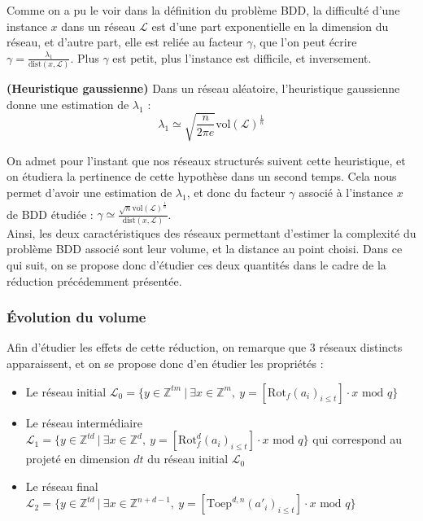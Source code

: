 \documentclass[11pt,a4paper]{article}
\begin{document}
Comme on a pu le voir dans la définition du problème BDD, la difficulté d'une instance $x$ dans un réseau $\mathcal{L}$ est d'une part exponentielle en la dimension du réseau, et d'autre part, elle est reliée au facteur $\gamma$, que l'on peut écrire $\gamma = \frac{\lambda_1}{\text{dist}(x,\mathcal{L})}$. Plus $\gamma$ est petit, plus l'instance est difficile, et inversement. \\


\begin{rem}\textbf{(Heuristique gaussienne)}
Dans un réseau aléatoire, l'heuristique gaussienne donne une estimation de $\lambda_1$ :  \[\lambda_1 \simeq \sqrt{\frac{n}{2\pi e}}\text{vol}(\mathcal{L})^\frac{1}{n} \]
\end{rem}

On admet pour l'instant que nos réseaux structurés suivent cette heuristique, et on étudiera la pertinence de cette hypothèse dans un second temps. Cela nous permet d'avoir une estimation de $\lambda_1$, et donc du facteur $\gamma$ associé à l'instance $x$ de BDD étudiée : $\gamma \simeq \frac{\sqrt{n}\text{vol}(\mathcal{L})^\frac{1}{n}}{\text{dist}(x,\mathcal{L})}$. \\

Ainsi, les deux caractéristiques des réseaux permettant d'estimer la complexité du problème BDD associé sont leur volume, et la distance au point choisi.  Dans ce qui suit, on se propose donc d'étudier ces deux quantités dans le cadre de la réduction précédemment présentée.

\subsubsection{Évolution du volume}

Afin d'étudier les effets de cette réduction, on remarque que $3$ réseaux distincts apparaissent, et on se propose donc d'en étudier les propriétés : 
\begin{itemize}
\item Le réseau initial $\mathcal{L}_0 = \{ y \in \mathbb{Z}^{tm} \ | \ \exists x\in \mathbb{Z}^m,\ y=[\text{Rot}_f(a_i)_{i\leq t}]\cdot x \text{ mod }q \}$
\item Le réseau intermédiaire $\mathcal{L}_1 =\{ y \in \mathbb{Z}^{td} \ | \ \exists x\in \mathbb{Z}^d,\ y=[\text{Rot}_f^d(a_i)_{i\leq t}]\cdot x \text{ mod }q \}$  qui correspond au projeté en dimension $dt$ du réseau initial $\mathcal{L}_0$
\item Le réseau final $\mathcal{L}_2 = \{ y \in \mathbb{Z}^{td} \ | \ \exists x\in \mathbb{Z}^{n+d-1},\ y=[\text{Toep}^{d,n}(a'_i)_{i\leq t}]\cdot x \text{ mod }q\}$ \\
\end{itemize}
\end{document}
